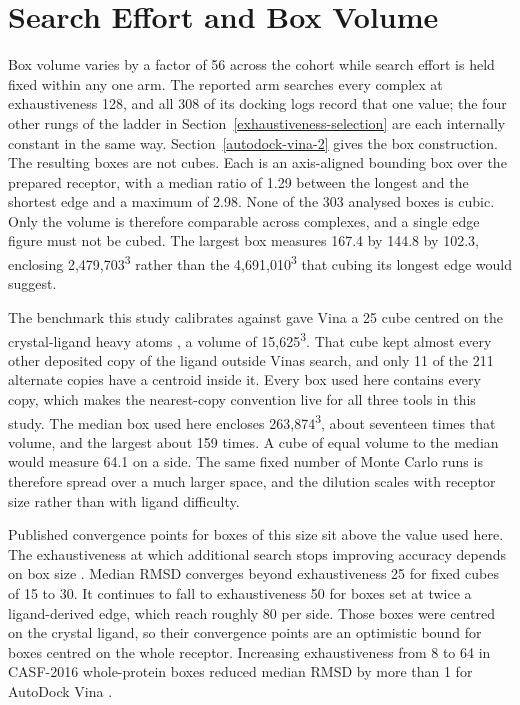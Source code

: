 \hypertarget{search-effort-and-box-volume}{%
\section{Search Effort and Box Volume}\label{search-effort-and-box-volume}}

Box volume varies by a factor of 56 across the cohort while search effort is held fixed within any one arm. The reported arm searches every complex at exhaustiveness 128, and all 308 of its docking logs record that one value; the four other rungs of the ladder in Section~\ref{exhaustiveness-selection} are each internally constant in the same way. Section~\ref{autodock-vina-2} gives the box construction. The resulting boxes are not cubes. Each is an axis-aligned bounding box over the prepared receptor, with a median ratio of 1.29 between the longest and the shortest edge and a maximum of 2.98. None of the 303 analysed boxes is cubic. Only the volume is therefore comparable across complexes, and a single edge figure must not be cubed. The largest box measures 167.4 by 144.8 by 102.3\angstrom{}, enclosing 2,479,703\angstrom{}\textsuperscript{3} rather than the 4,691,010\angstrom{}\textsuperscript{3} that cubing its longest edge would suggest.

The benchmark this study calibrates against gave Vina a 25\angstrom{} cube centred on the crystal-ligand heavy atoms \cite{ref035}, a volume of 15,625\angstrom{}\textsuperscript{3}. That cube kept almost every other deposited copy of the ligand outside Vina\textquotesingle s search, and only 11 of the 211 alternate copies have a centroid inside it. Every box used here contains every copy, which makes the nearest-copy convention live for all three tools in this study. The median box used here encloses 263,874\angstrom{}\textsuperscript{3}, about seventeen times that volume, and the largest about 159 times. A cube of equal volume to the median would measure 64.1\angstrom{} on a side. The same fixed number of Monte Carlo runs is therefore spread over a much larger space, and the dilution scales with receptor size rather than with ligand difficulty.

Published convergence points for boxes of this size sit above the value used here. The exhaustiveness at which additional search stops improving accuracy depends on box size \cite{ref081}. Median RMSD converges beyond exhaustiveness 25 for fixed cubes of 15 to 30\angstrom{}. It continues to fall to exhaustiveness 50 for boxes set at twice a ligand-derived edge, which reach roughly 80\angstrom{} per side. Those boxes were centred on the crystal ligand, so their convergence points are an optimistic bound for boxes centred on the whole receptor. Increasing exhaustiveness from 8 to 64 in CASF-2016 whole-protein boxes reduced median RMSD by more than 1\angstrom{} for AutoDock Vina \cite{ref082}.

